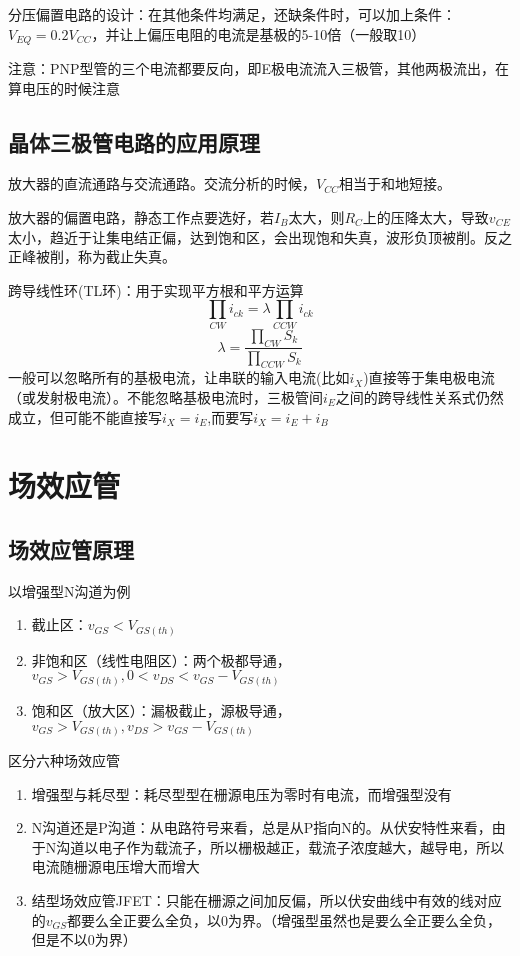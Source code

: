 \documentclass{ctexart}
\begin{document}
分压偏置电路的设计：在其他条件均满足，还缺条件时，可以加上条件：$V_{EQ}=0.2V_{CC}$，并让上偏压电阻的电流是基极的5-10倍（一般取10）

{\color{Red}注意：PNP型管的三个电流都要反向，即E极电流流入三极管，其他两极流出，在算电压的时候注意}
\subsection{晶体三极管电路的应用原理}
放大器的直流通路与交流通路。{\color{Red}交流分析的时候，$V_{CC}$相当于和地短接。}

放大器的偏置电路，静态工作点要选好，若$I_B$太大，则$R_C$上的压降太大，导致$v_{CE}$太小，趋近于让集电结正偏，达到饱和区，会出现饱和失真，波形负顶被削。反之正峰被削，称为截止失真。

跨导线性环(TL环)：用于实现平方根和平方运算
\begin{equation}
    \prod_{CW}i_{ck}=\lambda\prod_{CCW}i_{ck}
\end{equation}
\begin{equation}
    \lambda=\dfrac{\prod_{CW}S_k}{\prod_{CCW}S_k}
\end{equation}
一般可以忽略所有的基极电流，让串联的输入电流(比如$i_X$)直接等于集电极电流（或发射极电流）。不能忽略基极电流时，三极管间$i_E$之间的跨导线性关系式仍然成立，但可能不能直接写$i_X=i_E$,而要写$i_X=i_E+i_B$

\section{场效应管}
\subsection{场效应管原理}
以增强型N沟道为例
\begin{enumerate}
    \item 截止区：$v_{GS}<V_{GS(th)}$
    \item 非饱和区（线性电阻区）：两个极都导通，$v_{GS}>V_{GS(th)},0<v_{DS}<v_{GS}-V_{GS(th)}$
    \item 饱和区（放大区）：漏极截止，源极导通，$v_{GS}>V_{GS(th)},v_{DS}>v_{GS}-V_{GS(th)}$
\end{enumerate}

{\color{Red}区分六种场效应管}
\begin{enumerate}
    \item 增强型与耗尽型：耗尽型型在栅源电压为零时有电流，而增强型没有
    \item N沟道还是P沟道：从电路符号来看，总是从P指向N的。从伏安特性来看，由于N沟道以电子作为载流子，所以栅极越正，载流子浓度越大，越导电，所以电流随栅源电压增大而增大
    \item 结型场效应管JFET：只能在栅源之间加反偏，所以伏安曲线中有效的线对应的$v_{GS}$都要么全正要么全负，以0为界。（增强型虽然也是要么全正要么全负，但是不以0为界）
\end{enumerate}
\end{document}
